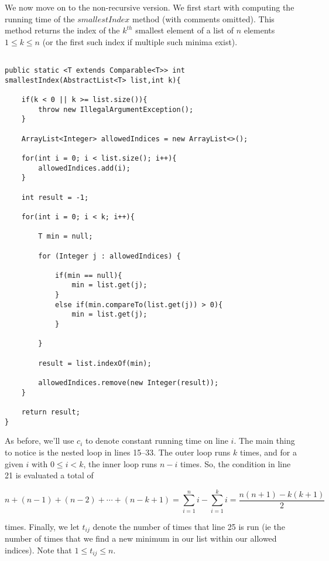 \documentclass{article}
\begin{document}
We now move on to the non-recursive version. We first start with computing the running time of the $smallestIndex$ method (with comments omitted). This method returns the index of the $k^{th}$ smallest element of a list of $n$ elements $1\leq k \leq n$ (or the first such index if multiple such minima exist).

\begin{verbatim}

public static <T extends Comparable<T>> int smallestIndex(AbstractList<T> list,int k){
		
	if(k < 0 || k >= list.size()){
		throw new IllegalArgumentException();
	}
		
	ArrayList<Integer> allowedIndices = new ArrayList<>();
	
	for(int i = 0; i < list.size(); i++){
		allowedIndices.add(i);
	}
	
	int result = -1;
	
	for(int i = 0; i < k; i++){
		
		T min = null;
		
		for (Integer j : allowedIndices) {
			
			if(min == null){
				min = list.get(j);
			}
			else if(min.compareTo(list.get(j)) > 0){
				min = list.get(j);
			}
			
		}
		
		result = list.indexOf(min);
		
		allowedIndices.remove(new Integer(result));
	}
	
	return result;
}

\end{verbatim}

\bigskip

As before, we'll use $c_i$ to denote constant running time on line $i$. The main thing to notice is the nested loop in lines 15--33. The outer loop runs $k$ times, and for a given $i$ with $0\leq i < k$, the inner loop runs $n-i$ times. So, the condition in line 21 is evaluated a total of 

\[
	n + (n-1) + (n-2) + \cdots + (n-k+1) = \sum\limits_{i=1}^n i - \sum\limits_{i=1}^k i = \frac{n(n+1) - k(k+1)}{2}
\]

\noindent times. Finally, we let $t_{ij}$ denote the number of times that line 25 is run (ie the number of times that we find a new minimum in our list within our allowed indices). Note that $1 \leq t_{ij} \leq n$.

\bigskip
\end{document}
